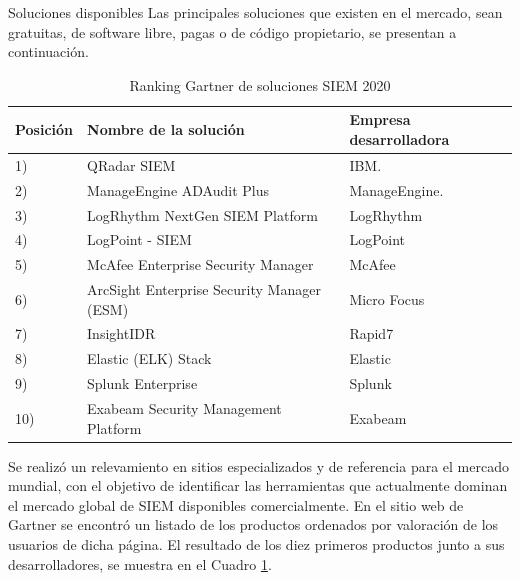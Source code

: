     \begin{section}{Soluciones disponibles}
    Las principales soluciones que existen en el mercado, sean gratuitas, de software libre, pagas o de código propietario,  se presentan a continuación.\par
    \begin{center}
        \begin{table}%
        \centering
        \begin{tabular}{ | m{4em} | m{22em}| m{12em} | }
            \hline
            Posición & Nombre de la solución & Empresa desarrolladora \\ 
            \hline
            1) & QRadar SIEM\cite{qradar} & IBM. \\ 
            \hline
            2) & ManageEngine ADAudit Plus\cite{adaudit} & ManageEngine. \\ 
            \hline
            3) & LogRhythm NextGen SIEM Platform\cite{logrhythm}
             & LogRhythm
            \\ 
             \hline
            4) & LogPoint - SIEM\cite{logpoint} & LogPoint  \\
             \hline
            5) & McAfee Enterprise Security Manager\cite{enterprise} & McAfee  \\
             \hline
            6) & ArcSight Enterprise Security Manager (ESM)\cite{arcsight} & Micro Focus  \\
             \hline
            7) & InsightIDR\cite{insight} & Rapid7  \\
             \hline
            8) & Elastic (ELK) Stack\cite{elastic} & Elastic  \\
             \hline
            9) & Splunk Enterprise\cite{splunk} & Splunk  \\
             \hline
            10) & Exabeam Security Management Platform\cite{exabeam} & Exabeam \\
            \hline %
        \end{tabular}
        \caption{Ranking Gartner \cite{ranking} de soluciones SIEM 2020}
        \label{table:2}
    \end{table}
    \end{center}
    \FloatBarrier
    Se realizó un relevamiento en sitios especializados y de referencia para el mercado mundial, con el objetivo de identificar las herramientas que actualmente dominan el mercado global de SIEM disponibles comercialmente. En el sitio web de Gartner \cite{ranking} se encontró un listado de los productos ordenados por valoración de los usuarios de dicha página. El resultado de los diez primeros productos junto a sus desarrolladores, se muestra en el Cuadro \ref{table:2}. \par
        

\end{section}
